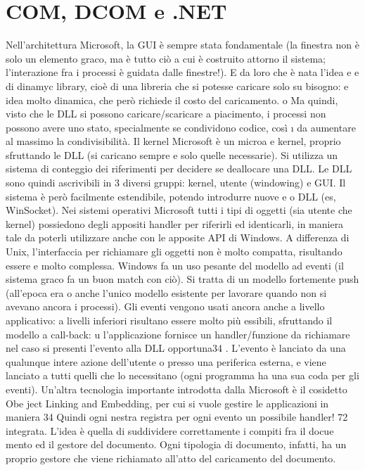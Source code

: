 \documentclass[a4paper,12pt]{article}
\begin{document}
\section{COM, DCOM e .NET}
Nell'architettura Microsoft, la GUI è sempre stata fondamentale (la finestra non è solo un elemento graco, ma è tutto
ciò a cui è costruito attorno il sistema; l'interazione fra i processi è guidata dalle finestre!). E da loro che è nata
l'idea
e
e
di dinamyc library, cioè di una libreria che si potesse caricare solo su bisogno:
e
idea molto dinamica, che però richiede il costo del caricamento.
o
Ma quindi, visto che le DLL si possono caricare/scaricare a piacimento, i
processi non possono avere uno stato, specialmente se condividono codice, così
\i{}
da aumentare al massimo la condivisibilità. Il kernel Microsoft è un microa
e
kernel, proprio sfruttando le DLL (si caricano sempre e solo quelle necessarie).
Si utilizza un sistema di conteggio dei riferimenti per decidere se deallocare una
DLL.
Le DLL sono quindi ascrivibili in 3 diversi gruppi: kernel, utente (windowing) e GUI. Il sistema è però facilmente
estendibile, potendo introdurre nuove
e
o
DLL (es, WinSocket).
Nei sistemi operativi Microsoft tutti i tipi di oggetti (sia utente che kernel)
possiedono degli appositi handler per riferirli ed identicarli, in maniera tale da
poterli utilizzare anche con le apposite API di Windows. A differenza di Unix,
l'interfaccia per richiamare gli oggetti non è molto compatta, risultando essere
e
molto complessa.
Windows fa un uso pesante del modello ad eventi (il sistema graco fa un
buon match con ciò). Si tratta di un modello fortemente push (all'epoca era
o
anche l'unico modello esistente per lavorare quando non si avevano ancora i
processi). Gli eventi vengono usati ancora anche a livello applicativo: a livelli
inferiori risultano essere molto più essibili, sfruttando il modello a call-back:
u
l'applicazione fornisce un handler/funzione da richiamare nel caso si presenti
l'evento alla DLL opportuna34 . L'evento è lanciato da una qualunque intere
azione dell'utente o presso una periferica esterna, e viene lanciato a tutti quelli
che lo necessitano (ogni programma ha una sua coda per gli eventi).
Un'altra tecnologia importante introdotta dalla Microsoft è il cosidetto Obe
ject Linking and Embedding, per cui si vuole gestire le applicazioni in maniera
34 Quindi
ogni nestra registra per ogni evento un possibile handler!
72
integrata. L'idea è quella di suddividere correttamente i compiti fra il docue
mento ed il gestore del documento. Ogni tipologia di documento, infatti, ha un
proprio gestore che viene richiamato all'atto del caricamento del documento.
\end{document}
